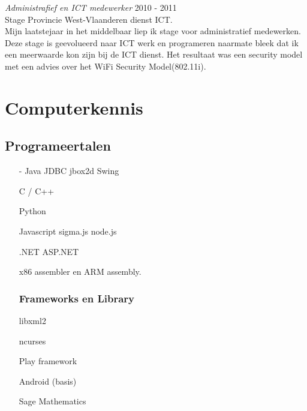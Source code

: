 \documentclass[margin, 10pt]{res} %
\begin{document}
\begin{resume}
{\sl Administrafief en ICT medewerker} \hfill 2010 - 2011 \\
Stage Provincie West-Vlaanderen dienst ICT. \\
Mijn laatstejaar in het middelbaar liep ik stage voor administratief medewerken. Deze stage is geevolueerd naar ICT werk en programeren naarmate bleek dat ik een meerwaarde kon zijn bij de ICT dienst. Het resultaat was een security model met een advies over het WiFi Security Model(802.11i).
\end{resume}
\section{Computerkennis}
\subsection{Programeertalen}
\begin{multicols}{2}
\begin{enumerate}
\item[-] Java
\subitem JDBC
\subitem jbox2d
\subitem Swing
\item[] C / C++
\item[] Python
\item[] Javascript
\subitem sigma.js
\subitem node.js
\item[] .NET
\subitem ASP.NET
\item[] x86 assembler en ARM assembly.
\subsubsection*{Frameworks en Library}
\item[] libxml2
\item[] ncurses
\item[] Play framework
\item[] Android (basis)
\item[] Sage Mathematics
\end{enumerate}
\end{multicols}
\end{document}
